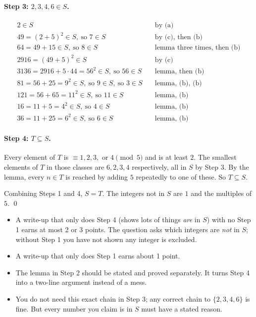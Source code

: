 \documentclass[11pt]{article}
\begin{document}
\paragraph{Step 3: $2, 3, 4, 6 \in S$.}
\begin{align*}
  2 \in S &\quad\text{by (a)}\\
  49 = (2+5)^2 \in S,\ \text{so } 7 \in S &\quad\text{by (c), then (b)}\\
  64 = 49 + 15 \in S,\ \text{so } 8 \in S &\quad\text{lemma three times, then (b)}\\
  2916 = (49+5)^2 \in S &\quad\text{by (c)}\\
  3136 = 2916 + 5\cdot 44 = 56^2 \in S,\ \text{so } 56 \in S &\quad\text{lemma, then (b)}\\
  81 = 56 + 25 = 9^2 \in S,\ \text{so } 9 \in S,\ \text{so } 3 \in S &\quad\text{lemma, (b), (b)}\\
  121 = 56 + 65 = 11^2 \in S,\ \text{so } 11 \in S &\quad\text{lemma, (b)}\\
  16 = 11 + 5 = 4^2 \in S,\ \text{so } 4 \in S &\quad\text{lemma, (b)}\\
  36 = 11 + 25 = 6^2 \in S,\ \text{so } 6 \in S &\quad\text{lemma, (b)}
\end{align*}

\paragraph{Step 4: $T \subseteq S$.} Every element of $T$ is $\equiv 1, 2, 3,$ or $4 \pmod 5$ and is at least $2$. The smallest elements of $T$ in those classes are $6, 2, 3, 4$ respectively, all in $S$ by Step 3. By the lemma, every $n \in T$ is reached by adding $5$ repeatedly to one of these. So $T \subseteq S$.

Combining Steps 1 and 4, $S = T$. The integers not in $S$ are $1$ and the multiples of $5$. \qed

\begin{gradingnote}\leavevmode
\begin{itemize}
  \item A write-up that only does Step 4 (shows lots of things \emph{are} in $S$) with no Step 1 earns at most 2 or 3 points. The question asks which integers are \emph{not} in $S$; without Step 1 you have not shown any integer is excluded.
  \item A write-up that only does Step 1 earns about 1 point.
  \item The lemma in Step 2 should be stated and proved separately. It turns Step 4 into a two-line argument instead of a mess.
  \item You do not need this exact chain in Step 3; any correct chain to $\{2,3,4,6\}$ is fine. But every number you claim is in $S$ must have a stated reason.
\end{itemize}
\end{gradingnote}
\end{document}

